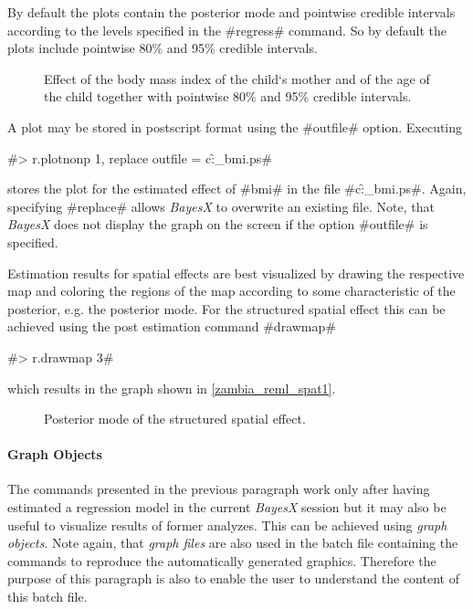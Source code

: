 By default the plots contain the posterior mode and pointwise
credible intervals according to the levels specified in the
#regress# command. So by default the plots include pointwise 80\%
and 95\% credible intervals.

\begin{figure}[ht]
\begin{center}
 {\it\caption{Effect
of the body mass index of the child`s mother and of the age of the
child together with pointwise 80\% and 95\% credible intervals.
\label{zambia_reml_bmi1}}}
\end{center}
\end{figure}

A plot may be stored in postscript format using the #outfile# option.
Executing

#> r.plotnonp 1, replace outfile = c:\data\f_bmi.ps#

stores the plot for the estimated effect of #bmi# in the file
#c:\data\f_bmi.ps#. Again, specifying #replace# allows {\it
BayesX} to overwrite an existing file. Note, that {\it BayesX}
does not display the graph on the screen if the option #outfile#
is specified.

Estimation results for spatial effects are best visualized by
drawing the respective map and coloring the regions of the map
according to some characteristic of the posterior, e.g. the
posterior mode. For the structured spatial effect this can be
achieved using the post estimation command #drawmap#

#> r.drawmap 3#

which results in the graph shown in \autoref{zambia_reml_spat1}.

\begin{figure}[ht]
\begin{center}
{\it\caption{Posterior mode of the structured spatial
effect.\label{zambia_reml_spat1}}}
\end{center}
\end{figure}


\paragraph{Graph Objects}

The commands presented in the previous paragraph work only after
having estimated a regression model in the current {\em BayesX} session
but it may also be useful to visualize results of former analyzes.
This can be achieved using {\em graph objects}. Note again, that
{\em graph files} are also used in the batch file containing the
commands to reproduce the automatically generated graphics.
Therefore the purpose of this paragraph is also to enable the user
to understand the content of this batch file.


